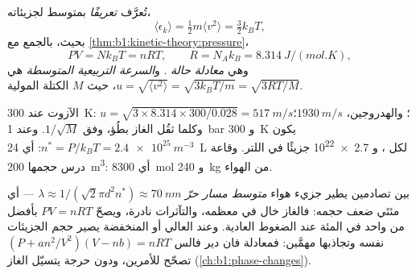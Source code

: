 \begin{definition}\label{def:b1:kinetic-theory:kinetictemp}
تُعرَّف   \emph{تعريفًا} بمتوسط  لجزيئاته،
\[
\langle\epsilon_k\rangle = \tfrac12 m\langle v^2\rangle = \tfrac32 k_BT ,
\]
بحيث، بالجمع مع \cref{thm:b1:kinetic-theory:pressure}،
\[
PV = Nk_BT = nRT, \qquad R = N_Ak_B = \qty{8.314}{J/(mol.K)} ,
\]
وهي \emph{معادلة حالة }. و\emph{السرعة التربيعية
المتوسطة} هي $u = \sqrt{\langle v^2\rangle} = \sqrt{3k_BT/m} = \sqrt{3RT/M}$،
حيث $M$ الكتلة المولية.
\end{definition}

\begin{example}\label{ex:b1:kinetic-theory:air}
الآزوت عند \qty{300}{K}: $u = \sqrt{3 \times 8.314 \times 300/0.028} =
\qty{517}{m/s}$؛ والهدروجين، $\qty{1930}{m/s}$؛ وكلما ثقُل الغاز بطُؤ، وفق
$1/\sqrt M$. وعند \qty{1}{bar} و \qty{300}{K} يكون $n^* = P/k_BT = \qty{2.4e25}{m^{-3}}$:
أي \qty{24}{L} لكل ، و \qty{2.7e22}{} جزيئًا في اللتر. وقاعة درس حجمها
\qty{200}{m^3}: أي \qty{8300}{mol} و \qty{240}{kg} من الهواء.
\end{example}

\begin{remark}\label{rem:b1:kinetic-theory:validity}
بين تصادمين يطير جزيء هواء \emph{متوسط مسار حرّ}
$\lambda \approx 1/(\sqrt2\pi d^2n^*) \approx \qty{70}{nm}$ --- أي مئتَي
ضعف حجمه: فالغاز خال في معظمه، والتآثرات نادرة،
ويصحّ $PV = nRT$ بأفضل من واحد في المئة عند الضغوط العادية. وعند 
العالي أو  المنخفضة يصير حجم الجزيئات نفسه وتجاذبها مهمَّين:
فمعادلة فان دير فالس $(P + an^2/V^2)(V - nb) = nRT$
تصحّح للأمرين، ودون  حرجة يتسيّل الغاز
(\cref{ch:b1:phase-changes}).
\end{remark}

